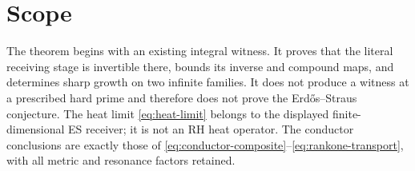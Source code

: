 

\section{Scope}

The theorem begins with an existing integral witness. It proves that the
literal receiving stage is invertible there, bounds its inverse and compound
maps, and determines sharp growth on two infinite families. It does not
produce a witness at a prescribed hard prime and therefore does not prove the
Erd\H{o}s--Straus conjecture. The heat limit
\eqref{eq:heat-limit} belongs to the displayed finite-dimensional ES receiver;
it is not an RH heat operator. The conductor conclusions are exactly those
of \eqref{eq:conductor-composite}--\eqref{eq:rankone-transport}, with all
metric and resonance factors retained.
